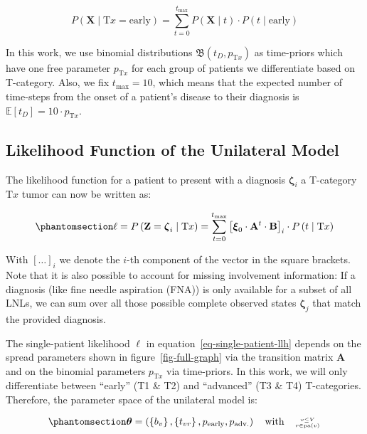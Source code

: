 \documentclass[
  sn-mathphys-num,
]{sn-jnl}
\begin{document}
\[
P\left( \mathbf{X} \mid \text{T}x = \text{early} \right) = \sum_{t=0}^{t_\text{max}} P \left( \mathbf{X} \mid t \right) \cdot P(t \mid \text{early})
\]

In this work, we use binomial distributions
\(\mathfrak{B} \left( t_D, p_{\text{T}x} \right)\) as time-priors which
have one free parameter \(p_{\text{T}x}\) for each group of patients we
differentiate based on T-category. Also, we fix \(t_\text{max} = 10\),
which means that the expected number of time-steps from the onset of a
patient's disease to their diagnosis is
\(\mathbb{E}\left[ t_D \right] = 10 \cdot p_{\text{T}x}\).

\subsection{Likelihood Function of the Unilateral
Model}\label{likelihood-function-of-the-unilateral-model}

The likelihood function for a patient to present with a diagnosis
\(\boldsymbol{\zeta}_i\) a T-category \(\text{T}x\) tumor can now be
written as:

\begin{equation}\phantomsection\label{eq-single-patient-llh}{
\ell = P \left( \mathbf{Z} = \boldsymbol{\zeta}_i \mid \text{T}x \right) = \sum_{t=0}^{t_\text{max}} \left[ \boldsymbol{\xi}_0 \cdot \mathbf{A}^t \cdot \mathbf{B} \right]_i \cdot P \left( t \mid \text{T}x \right)
}\end{equation}

With \(\left[ \ldots \right]_i\) we denote the \(i\)-th component of the
vector in the square brackets. Note that it is also possible to account
for missing involvement information: If a diagnosis (like fine needle
aspiration (FNA)) is only available for a subset of all LNLs, we can sum
over all those possible complete observed states
\(\boldsymbol{\zeta}_j\) that match the provided diagnosis.

The single-patient likelihood \(\ell\) in
equation~\ref{eq-single-patient-llh} depends on the spread parameters
shown in figure~\ref{fig-full-graph} via the transition matrix
\(\mathbf{A}\) and on the binomial parameters \(p_{\text{T}x}\) via
time-priors. In this work, we will only differentiate between ``early''
(T1 \& T2) and ``advanced'' (T3 \& T4) T-categories. Therefore, the
parameter space of the unilateral model is:

\begin{equation}\phantomsection\label{eq-param-space}{
\boldsymbol{\theta} = \left( \left\{ b_v \right\}, \left\{ t_{vr} \right\}, p_\text{early}, p_\text{adv.} \right) \quad \text{with} \quad \genfrac{}{}{0pt}{2}{v\leq V}{r\in\operatorname{pa}(v)}
}\end{equation}
\end{document}
